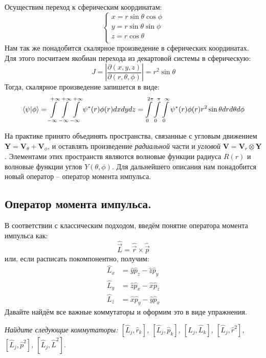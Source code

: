 Осуществим переход к сферическим координатам:
\[
\begin{cases}
x = r \sin \theta \cos \phi\\
y = r \sin \theta \sin \phi \\
z = r \cos \theta \\
\end{cases}
\]
Нам так же понадобится скалярное произведение в сферических координатах. Для этого посчитаем якобиан перехода из декартовой системы в сферическую:
\[
J = \left|\frac{\partial(x, y, z)}{\partial(r, \theta, \phi)}\right| = r^2\sin\theta
\]
Тогда, скалярное произведение запишется в виде:
\[
\bra{\psi}\ket{\phi} = \int\limits_{-\infty}^{+\infty}\int\limits_{-\infty}^{+\infty}\int\limits_{-\infty}^{+\infty}\psi^*(r)\phi(r)dxdydz= \int\limits_0^{2\pi}\int\limits_0^{\pi}\int\limits_0^{\infty}\psi^*(r)\phi(r)r^2\sin\theta dr d\theta d\phi
\]

На практике принято объединять пространства, связанные с угловым движением $\mathbf{Y} = \mathbf{V}_{\theta} + \mathbf{V}_{\phi}$, и оставлять произведение \textit{радиальной} части и \textit{угловой} $\mathbf{V} = \mathbf{V}_r \otimes \mathbf{Y}$. Элементами этих пространств являются волновые функции радиуса $R(r)$ и волновые функции углов $Y(\theta, \phi)$. Для дальнейшего описания нам понадобится новый оператор -- оператор момента импульса.
\subsection{Оператор момента импульса.}
\hspace{1em} В соответствии с классическим подходом, введём понятие оператора момента импульса как:
\[
\hat{\Vec{L}} = \hat{\Vec{r}} \times \hat{\Vec{p}}
\]
или, если расписать покомпонентно, получим:
\begin{align*}
    \hat{L}_x &= \hat{y}\hat{p}_z - \hat{z}\hat{p}_y\\
    \hat{L}_y &= \hat{z}\hat{p}_x - \hat{x}\hat{p}_z\\
    \hat{L}_z &= \hat{x}\hat{p}_y - \hat{y}\hat{p}_x
\end{align*}
Давайте найдём все важные коммутаторы и оформим это в виде упражнения.
\begin{center}
    \textit{Найдите следующие коммутаторы: $[\hat{L}_j, \hat{r}_k]$, $[\hat{L}_j, \hat{p}_k]$, $[\hat{L}_j, \hat{L}_k]$, $[\hat{L}_j, \hat{r}^2]$, $[\hat{L}_j, \hat{p}^2]$, $[\hat{L}_j, \hat{L}^2]$.}
\end{center}

